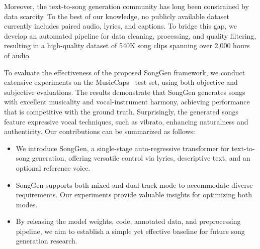 
Moreover, the text-to-song generation community has long been constrained by data scarcity. To the best of our knowledge, no publicly available dataset currently includes paired audio, lyrics, and captions. To bridge this gap, we develop an automated pipeline for data cleaning, processing, and quality filtering, resulting in a high-quality dataset of 540K song clips spanning over 2,000 hours of audio. 

To evaluate the effectiveness of the proposed SongGen framework, we conduct extensive experiments on the MusicCaps~\cite{agostinelli2023musiclm} test set, using both objective and subjective evaluations. 
The results demonstrate that SongGen generates songs with excellent musicality and vocal-instrument harmony, achieving performance that is competitive with the ground truth. 
Surprisingly, the generated songs feature expressive vocal techniques, such as vibrato, enhancing naturalness and authenticity.
Our contributions can be summarized as follows:
\vspace{-8pt}
\begin{itemize}
\setlength{\itemsep}{0pt}
 \item We introduce SongGen, a single-stage auto-regressive transformer for text-to-song generation, offering versatile control via lyrics, descriptive text, and an optional reference voice.
 \item SongGen supports both mixed and dual-track mode to accommodate diverse requirements. Our experiments provide valuable insights for optimizing both modes.
 \item By releasing the model weights, code, annotated data, and preprocessing pipeline, we aim to establish a simple yet effective baseline for future song generation research.
\end{itemize}






